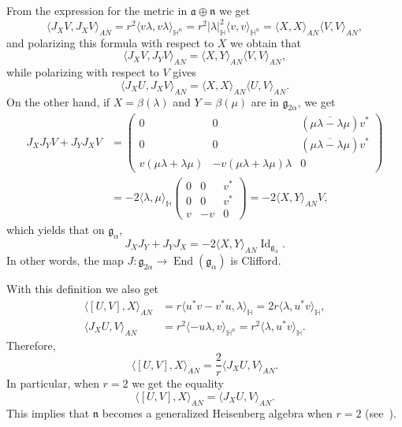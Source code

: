 \documentclass[12pt, a4paper,draft]{amsart}
\newcommand{\g}{\mathfrak}
\renewcommand{\H}{\mathbb{H}}
\theoremstyle{remark}
\begin{document}
From the expression for the metric in $\g{a}\oplus\g{n}$ we get
\[
\langle J_X V,J_X V\rangle_{AN}
=r^2\langle v\lambda,v\lambda\rangle_{\H^n}
=r^2\lvert\lambda\rvert_{\H}^2\langle v, v\rangle_{\H^n}
=\langle X,X\rangle_{AN}\langle V, V\rangle_{AN},
\]	
and polarizing this formula with respect to $X$ we obtain that
\begin{equation}\label{eq:j-norm}
	\langle J_{X}V,J_{Y}V\rangle_{AN}=\langle X,Y\rangle_{AN}\langle V,V\rangle_{AN},
\end{equation}
while polarizing with respect to $V$ gives
\[
	\langle J_{X}U,J_{X}V\rangle_{AN}=\langle X,X\rangle_{AN}\langle U,V\rangle_{AN}.
\]
On the other hand, if $X=\beta(\lambda)$ and $Y=\beta(\mu)$ are in $\g{g}_{2\alpha}$, we get
\[
\begin{aligned}
J_X J_Y V+J_Y J_X V
&{}=\left(
\begin{array}{cc|c}
	0 & 0 & (\overline{\mu\lambda-\lambda\mu})v^{*} \\
	0 & 0 & (\overline{\mu\lambda-\lambda\mu})v^{*} \\
	\hline
	v(\mu\lambda+\lambda\mu) & -v(\mu\lambda+\lambda\mu)\lambda & 0
\end{array}
\right)\\
&{}=-2\langle\lambda,\mu\rangle_{\H} \left(
\begin{array}{cc|c}
	0 & 0 & v^{*} \\
	0 & 0 & v^{*} \\
	\hline
	v  & -v & 0
\end{array}
\right)
=-2\langle X,Y\rangle_{AN} V,
\end{aligned}
\]
which yields that on $\g{g}_{\alpha}$,
\[
	J_{X}J_{Y}+J_{Y}J_{X}=-2\langle X,Y\rangle_{AN} \operatorname{Id}_{\g{g}_{\alpha}}.
\]
In other words, the map $J\colon \g{g}_{2\alpha}\to\operatorname{End}(\g{g}_{\alpha})$ is Clifford.

With this definition we also get
\[
\begin{aligned}
\langle[U,V],X\rangle_{AN}
&{}=r\langle u^*v-v^*u,\lambda\rangle_{\H}
=2r\langle\lambda,u^*v\rangle_\H,\\
\langle J_X U,V\rangle_{AN}
&{}=r^2\langle -u\lambda,v\rangle_{\H^n}
=r^2\langle\lambda,u^*v\rangle_\H.
\end{aligned}
\]
Therefore,
\begin{equation}\label{eq:damek-ricci-r}
\langle[U,V],X\rangle_{AN}=\frac{2}{r}\langle J_X U,V\rangle_{AN}.
\end{equation}
In particular, when $r=2$ we get the equality
\[
	\langle [U,V],X\rangle_{AN}=\langle J_{X}U,V\rangle_{AN}.
\]
This implies that $\g{n}$ becomes a generalized Heisenberg algebra when $r=2$ (see~\cite{BerndtTricerriVanhecke}).
\end{document}
